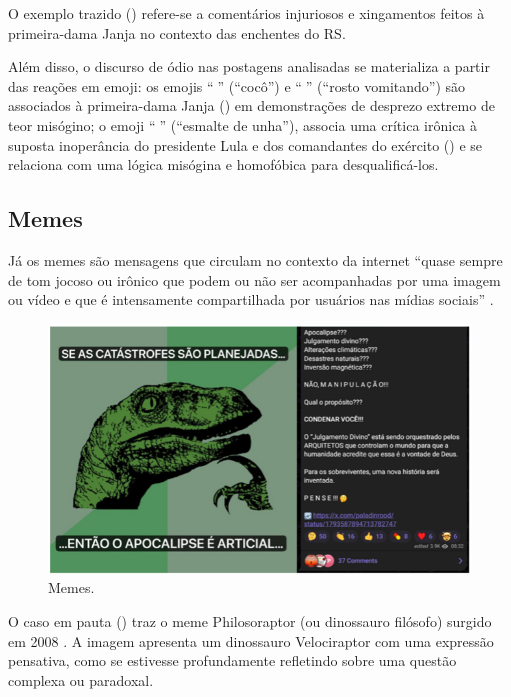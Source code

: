 \documentclass[portuguese]{textolivre}
\begin{document}
O exemplo trazido () refere-se a comentários injuriosos e xingamentos feitos à primeira-dama Janja no contexto das enchentes do RS. 

Além disso, o discurso de ódio nas postagens analisadas se materializa a partir das reações em emoji: os emojis ``{\Symbola 💩}'' (``cocô'') e ``{\Symbola 🤮}'' (``rosto vomitando'') são associados à primeira-dama Janja () em demonstrações de desprezo extremo de teor misógino; o emoji ``{\Symbola 💅}'' (``esmalte de unha''), associa uma crítica irônica à suposta inoperância do presidente Lula e dos comandantes do exército () e se relaciona com uma lógica misógina e homofóbica para desqualificá-los.

\subsection{Memes}
Já os memes são mensagens que circulam no contexto da internet ``quase sempre de tom jocoso ou irônico que podem ou não ser acompanhadas por uma imagem ou vídeo e que é intensamente compartilhada por usuários nas mídias sociais'' \cite[p. 60]{torres2016}.

\begin{figure}[ht]
    \centering
    \begin{minipage}{.75\textwidth}
        \centering
        \includegraphics[width=\textwidth]{Imagens/Fig42.png}
        \caption{Memes.}
        \label{fig-42}
    \end{minipage}
    \end{figure}
    
O caso em pauta () traz o meme Philosoraptor (ou dinossauro filósofo) surgido em 2008 \cite{museudosememes2025}. A imagem apresenta um dinossauro Velociraptor com uma expressão pensativa, como se estivesse profundamente refletindo sobre uma questão complexa ou paradoxal.
\end{document}
